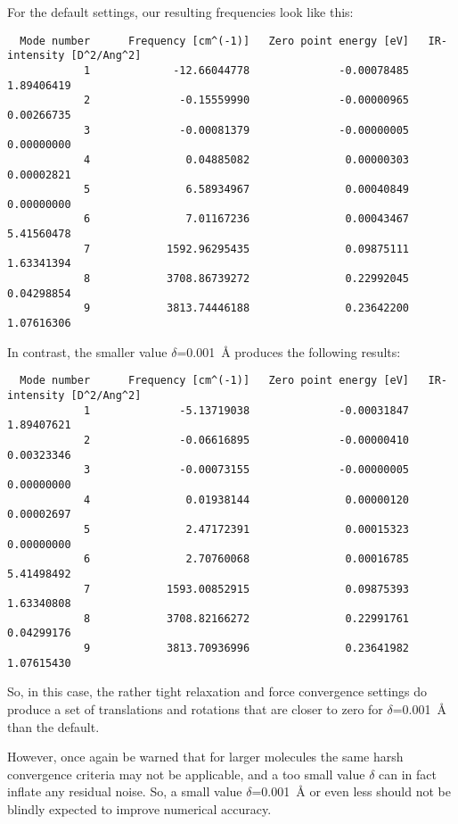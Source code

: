 For the default settings, our resulting frequencies look like this:
{\footnotesize
\begin{verbatim}
  Mode number      Frequency [cm^(-1)]   Zero point energy [eV]   IR-intensity [D^2/Ang^2]
            1             -12.66044778              -0.00078485                 1.89406419
            2              -0.15559990              -0.00000965                 0.00266735
            3              -0.00081379              -0.00000005                 0.00000000
            4               0.04885082               0.00000303                 0.00002821
            5               6.58934967               0.00040849                 0.00000000
            6               7.01167236               0.00043467                 5.41560478
            7            1592.96295435               0.09875111                 1.63341394
            8            3708.86739272               0.22992045                 0.04298854
            9            3813.74446188               0.23642200                 1.07616306
\end{verbatim}
}

In contrast, the smaller value $\delta$=0.001~{\AA} produces the
following results:
{\footnotesize
\begin{verbatim}
  Mode number      Frequency [cm^(-1)]   Zero point energy [eV]   IR-intensity [D^2/Ang^2]
            1              -5.13719038              -0.00031847                 1.89407621
            2              -0.06616895              -0.00000410                 0.00323346
            3              -0.00073155              -0.00000005                 0.00000000
            4               0.01938144               0.00000120                 0.00002697
            5               2.47172391               0.00015323                 0.00000000
            6               2.70760068               0.00016785                 5.41498492
            7            1593.00852915               0.09875393                 1.63340808
            8            3708.82166272               0.22991761                 0.04299176
            9            3813.70936996               0.23641982                 1.07615430
\end{verbatim}
}

So, in this case, the rather tight relaxation and force convergence
settings do produce a set of translations and rotations that are
closer to zero for $\delta$=0.001~{\AA} than the default.

However, once again be warned that for larger molecules the same harsh
convergence criteria may not be applicable, and a too small value
$\delta$ can in fact inflate any residual noise. So, a small value
$\delta$=0.001~{\AA} or even less should not be blindly expected to improve
numerical accuracy. 

